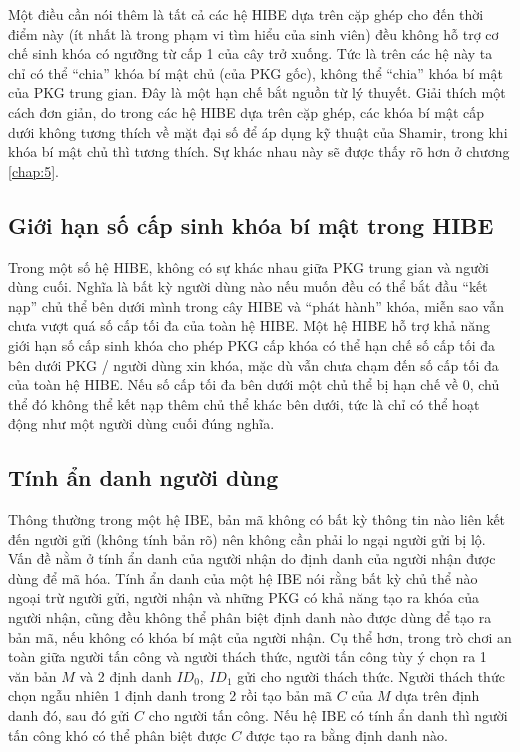 \documentclass[class=report, crop=false]{standalone}
\begin{document}
			Một điều cần nói thêm là tất cả các hệ HIBE dựa trên cặp ghép cho đến thời điểm này (ít nhất là trong phạm vi tìm hiểu của sinh viên) đều không hỗ trợ cơ chế sinh khóa có ngưỡng từ cấp 1 của cây trở xuống. Tức là trên các hệ này ta chỉ có thể ``chia'' khóa bí mật chủ (của PKG gốc), không thể ``chia'' khóa bí mật của PKG trung gian. Đây là một hạn chế bắt nguồn từ lý thuyết. Giải thích một cách đơn giản, do trong các hệ HIBE dựa trên cặp ghép, các khóa bí mật cấp dưới không tương thích về mặt đại số để áp dụng kỹ thuật của Shamir, trong khi khóa bí mật chủ thì tương thích. Sự khác nhau này sẽ được thấy rõ hơn ở chương \ref{chap:5}.
		\subsection{Giới hạn số cấp sinh khóa bí mật trong HIBE}\label{chap2:sec4:restrict_key_derivation}
			Trong một số hệ HIBE, không có sự khác nhau giữa PKG trung gian và người dùng cuối. Nghĩa là bất kỳ người dùng nào nếu muốn đều có thể bắt đầu ``kết nạp'' chủ thể bên dưới mình trong cây HIBE và ``phát hành'' khóa, miễn sao vẫn chưa vượt quá số cấp tối đa của toàn hệ HIBE. Một hệ HIBE hỗ trợ khả năng giới hạn số cấp sinh khóa cho phép PKG cấp khóa có thể hạn chế số cấp tối đa bên dưới PKG / người dùng xin khóa, mặc dù vẫn chưa chạm đến số cấp tối đa của toàn hệ HIBE. Nếu số cấp tối đa bên dưới một chủ thể bị hạn chế về $0$, chủ thể đó không thể kết nạp thêm chủ thể khác bên dưới, tức là chỉ có thể hoạt động như một người dùng cuối đúng nghĩa.
		\subsection{Tính ẩn danh người dùng}
			Thông thường trong một hệ IBE, bản mã không có bất kỳ thông tin nào liên kết đến người gửi (không tính bản rõ) nên không cần phải lo ngại người gửi bị lộ. Vấn đề nằm ở tính ẩn danh của người nhận do định danh của người nhận được dùng để mã hóa. Tính ẩn danh của một hệ IBE nói rằng bất kỳ chủ thể nào ngoại trừ người gửi, người nhận và những PKG có khả năng tạo ra khóa của người nhận, cũng đều không thể phân biệt định danh nào được dùng để tạo ra bản mã, nếu không có khóa bí mật của người nhận. Cụ thể hơn, trong trò chơi an toàn giữa người tấn công và người thách thức, người tấn công tùy ý chọn ra 1 văn bản $M$ và 2 định danh $ID_0,\ ID_1$ gửi cho người thách thức. Người thách thức chọn ngẫu nhiên 1 định danh trong 2 rồi tạo bản mã $C$ của $M$ dựa trên định danh đó, sau đó gửi $C$ cho người tấn công. Nếu hệ IBE có tính ẩn danh thì người tấn công khó có thể phân biệt được $C$ được tạo ra bằng định danh nào.
\end{document}
